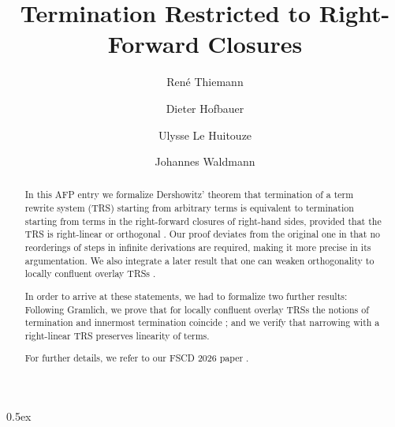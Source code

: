 \documentclass[11pt,a4paper]{article}
\begin{document}
\title{Termination Restricted to Right-Forward Closures}
\author{René Thiemann}
\author{Dieter Hofbauer}
\author{Ulysse {Le Huitouze}}
\author{Johannes Waldmann}
\maketitle

\begin{abstract}
  In this AFP entry we formalize Dershowitz' theorem 
  that termination of a term rewrite system (TRS) starting from arbitrary
  terms is equivalent to termination starting from
  terms in the right-forward closures of right-hand sides, 
  provided that the TRS is right-linear or orthogonal \cite{Der81}. Our proof
  deviates from the original one in that no reorderings of steps in infinite
  derivations are required, making it more precise in its argumentation. We also
  integrate a later result that one can weaken orthogonality to locally confluent
  overlay TRSs \cite{DershowitzH95}. 
  
  In order to arrive at these statements, we had to formalize two further results:  
  Following Gramlich, we prove that for locally confluent overlay TRSs the notions of termination
  and innermost termination coincide \cite{Gramlich92}; and we verify that narrowing 
  with a right-linear TRS preserves linearity of terms.
  
  For further details, we refer to our FSCD 2026 paper \cite{FSCD2026}.
\end{abstract}

\tableofcontents

\parindent 0pt\parskip 0.5ex





\end{document}
